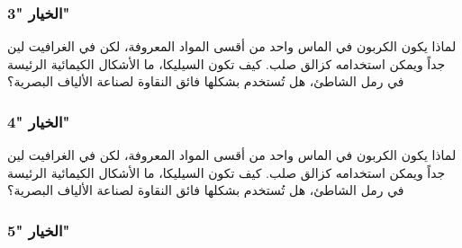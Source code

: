 \documentclass[12pt,a4paper]{mathbook_arabic}
\newcommand\ee{\textenglish}
\begin{document}
\subsubsection{الخيار \ee{"3"}}

 




\begin{demonstration}[3]
  لماذا يكون الكربون في الماس واحد من أقسى المواد المعروفة، لكن في الغرافيت لين جداً ويمكن استخدامه كزالق صلب.
     كيف تكون السيليكا، ما الأشكال الكيمائية الرئيسة في رمل الشاطئ، هل تُستخدم 
     بشكلها فائق النقاوة لصناعة الألياف البصرية؟
\end{demonstration}

 
\subsubsection{الخيار \ee{"4"}}



\begin{demonstration}[4]
  لماذا يكون الكربون في الماس واحد من أقسى المواد المعروفة، لكن في الغرافيت لين جداً ويمكن استخدامه كزالق صلب.
     كيف تكون السيليكا، ما الأشكال الكيمائية الرئيسة في رمل الشاطئ، هل تُستخدم 
     بشكلها فائق النقاوة لصناعة الألياف البصرية؟
\end{demonstration}



 
\subsubsection{الخيار \ee{"5"}}

 



\end{document}
